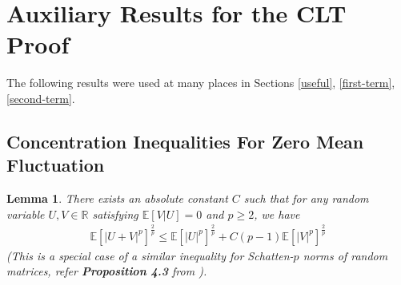 \documentclass[11pt, reqno,english]{amsart}
\newtheorem{lemma}{Lemma}[section]
\begin{document}
\section{Auxiliary Results for the CLT Proof}\label{sec:app3}
The following results were used at many places in Sections \ref{useful}, \ref{first-term}, \ref{second-term}.
\subsection{Concentration Inequalities For Zero Mean Fluctuation}
\begin{lemma}\label{uniformconvexity3}
There exists an absolute constant $C$ such that for any random variable $U, V \in \mathbb{R}$ satisfying $\mathbb{E}[V|U] = 0$ and $p \geq 2$, we have  
\begin{align*}
\mathbb{E}[|U + V|^p]^{\frac{2}{p}} \leq \mathbb{E}[|U|^p]^{\frac{2}{p}} + C(p-1)\mathbb{E}[|V|^p]^{\frac{2}{p}}
\end{align*}
(This is  a special case of a similar inequality for Schatten-$p$ norms of random matrices, refer \textbf{Proposition 4.3} from \cite{huang2022matrix}).
\end{lemma}
\end{document}
